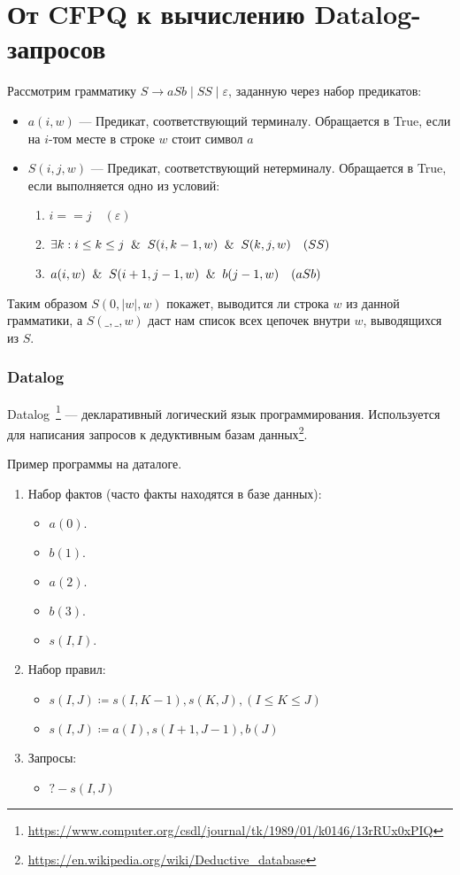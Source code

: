 \chapter{От CFPQ к вычислению Datalog-запросов}\label{Subsection Datalog}
Рассмотрим грамматику  $S \rightarrow aSb \mid SS \mid \varepsilon$, заданную через набор предикатов:
\begin{itemize}
	\item $a(i, w)$ --- Предикат, соответствующий терминалу. Обращается в True, если на $i$-том месте в строке $w$ стоит символ $a$
	\item $S(i, j, w)$ --- Предикат, соответствующий нетерминалу. Обращается в True, если выполняется одно из условий:
	\begin{enumerate}
		\item $i == j \quad(\varepsilon)$
		\item $\exists k: i \leq k \leq j \And S(i, k - 1, w) \And S(k, j, w)  \quad (SS)$
		\item  ${a(i, w) \And S(i+1, j-1, w) \And b(j-1, w)} \quad (aSb)$
	\end{enumerate}
\end{itemize}

Таким образом $S(0,|w|,w)$ покажет, выводится ли строка $w$ из данной грамматики,
а $S(\_,\_,w)$ даст нам список всех цепочек внутри $w$, выводящихся из $S$.

\subsection{Datalog}
Datalog~\cite{Datalog}\footnote{\url{https://www.computer.org/csdl/journal/tk/1989/01/k0146/13rRUx0xPIQ}} --- декларативный логический язык программирования. Используется для написания запросов к дедуктивным базам данных\footnote{\url{https://en.wikipedia.org/wiki/Deductive_database}}. 

\begin{example}
	Пример программы на даталоге.
	\begin{enumerate}
		\item Набор фактов (часто факты находятся в базе данных):
		\begin{itemize}
			\item $a(0).$
			\item $b(1).$
			\item $a(2).$
			\item $b(3).$
			\item $s(I, I).$
		\end{itemize}
		\item Набор правил:
		\begin{itemize}
			\item $s(I, J) \coloneq s(I, K-1), s(K,J), (I \leq K \leq J)$
			\item $s(I,J)\coloneq a(I), s(I+1, J-1),b(J)$
		\end{itemize}
		\item Запросы:
		\begin{itemize}
			\item $?- s(I, J)$
		\end{itemize}
	\end{enumerate}
\end{example}


